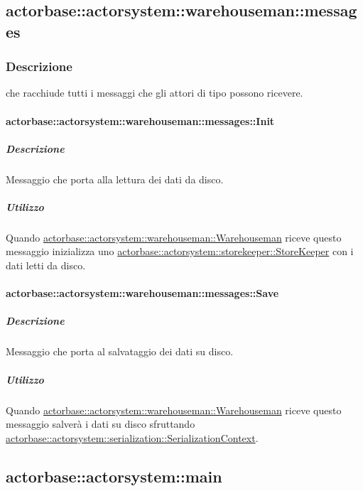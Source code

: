 \documentclass{scalatekids-article}
\begin{document}
\subsection{actorbase::actorsystem::warehouseman::messages}
\label{sec:actorbase::actorsystem::warehouseman::messages}

\subsubsection{Descrizione}

 che racchiude tutti i messaggi che gli attori di tipo
 possono ricevere.

\paragraph{actorbase::actorsystem::warehouseman::messages::Init}
\label{sec:actorbase::actorsystem::warehouseman::messages::Init}

\subparagraph{Descrizione}

Messaggio che porta alla lettura dei dati da disco.

\subparagraph{Utilizzo}

Quando \hyperref[sec:actorbase::actorsystem::warehouseman::Warehouseman]{actorbase::actorsystem::warehouseman::Warehouseman}
riceve questo messaggio inizializza uno \hyperref[sec:actorbase::actorsystem::storekeeper::StoreKeeper]{actorbase::actorsystem::storekeeper::StoreKeeper}
con i dati letti da disco.

\paragraph{actorbase::actorsystem::warehouseman::messages::Save}
\label{sec:actorbase::actorsystem::warehouseman::messages::Save}

\subparagraph{Descrizione}

Messaggio che porta al salvataggio dei dati su disco.

\subparagraph{Utilizzo}

Quando \hyperref[sec:actorbase::actorsystem::warehouseman::Warehouseman]{actorbase::actorsystem::warehouseman::Warehouseman}
riceve questo messaggio salverà i dati su disco sfruttando
\hyperref[sec:actorbase::actorsystem::serialization::SerializationContext]{actorbase::actorsystem::serialization::SerializationContext}.

\subsection{actorbase::actorsystem::main}
\label{sec:actorbase::actorsystem::main}
\end{document}
